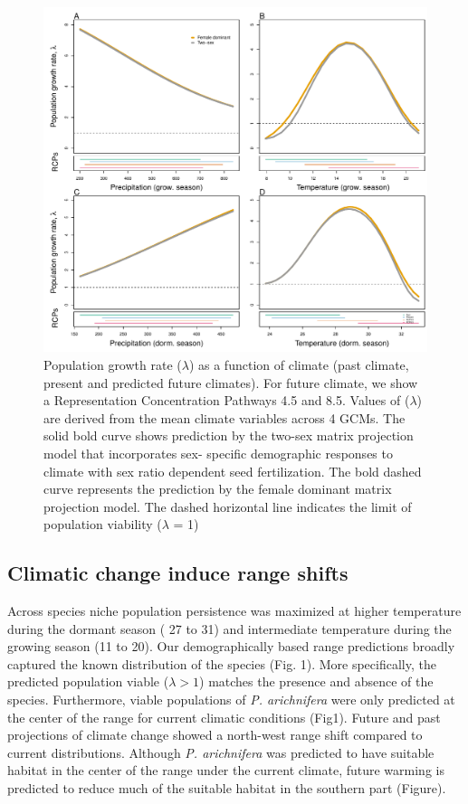 \documentclass[12pt]{article}
\begin{document}
\begin{figure}[h!]
  \begin{center}
    \includegraphics[width=0.95\linewidth]{Figures/lambda_past_present_future.pdf}
  \caption{Population growth rate ($\lambda$) as a function of climate (past climate, present and predicted future climates). For future climate, we show a Representation Concentration Pathways 4.5 and 8.5. Values of ($\lambda$) are derived from the mean climate variables across 4 GCMs. The solid bold curve shows prediction by the two-sex matrix projection model that incorporates sex- specific demographic responses to climate with sex ratio dependent seed fertilization. The bold dashed curve represents the prediction by the female dominant matrix projection model. The dashed horizontal line indicates the limit of population viability ($\lambda$ = 1)}
  \label{fig:lambda}
  \end{center}
\end{figure}

\subsection*{Climatic change induce range shifts}
Across species niche population persistence was maximized at higher temperature during the dormant season ( 27 to 31) and intermediate temperature during the growing season (11 to 20). 
Our demographically based range predictions broadly captured the known distribution of the species (Fig. 1). 
More specifically, the predicted population viable ($\lambda>1$) matches the presence and absence of the species. 
Furthermore, viable populations of \emph{P. arichnifera} were only predicted at the center of the range for current climatic conditions (Fig1).
Future and past projections of climate change showed a north-west range shift compared to current distributions. 
Although \emph{P. arichnifera} was predicted to have suitable habitat in the center of the range under the current climate, future warming is predicted to reduce much of the suitable habitat in the southern part (Figure). 
\end{document}
